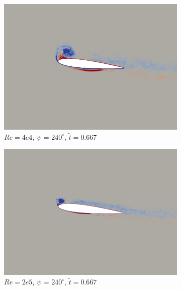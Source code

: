 \begin{figure}[H]
	\begin{subfigure}[b]{0.32\textwidth}
		\centering
		\includegraphics[width=1\textwidth]{figures/Vorticity_plots/Re_40k_1pt2/phase_240.png}
		\caption{$Re=4e4$, $\psi$ = $240^\circ$, $\tilde{t}=0.667$}
		\label{fig:Re_40k_1pt2_phi240}
	\end{subfigure}
	\begin{subfigure}[b]{0.32\textwidth}
		\centering
		\includegraphics[width=1\textwidth]{figures/Vorticity_plots/Re_200k_1pt2/phase_240.png}
		\caption{$Re=2e5$, $\psi$ = $240^\circ$, $\tilde{t}=0.667$}
		\label{fig:Re_200k_1pt2_phi240}
	\end{subfigure}
	\begin{subfigure}[b]{0.32\textwidth}
		\centering

\end{subfigure}
\end{figure}

